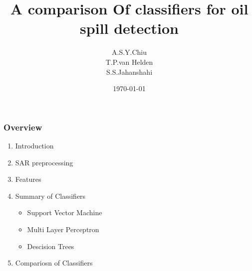 \documentclass{beamer}
\title[Comparison of classifiers]{A comparison Of classifiers for oil spill detection} %
\institute[TUDelft] %
{
Delft University of Technology \\ %
\medskip
}
\date{\today} %
\author{A.S.Y.Chiu\\ T.P.van Helden\\S.S.Jahanshahi} %
\begin{document}
\begin{frame}
\titlepage %
\end{frame}

\begin{frame}
\frametitle{Overview} %
\begin{enumerate}
	\item Introduction
	\item SAR preprocessing
	\item Features
	\item Summary of Classifiers 
	\begin{itemize}
		\item Support Vector Machine
		\item Multi Layer Perceptron
		\item Descision Trees
		
	\end{itemize}
	\item Compariosn of Classifiers
\end{enumerate}

\end{frame}



\end{document}
